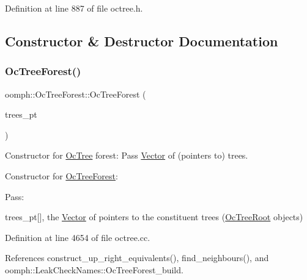 Definition at line 887 of file octree.\+h.



\subsection{Constructor \& Destructor Documentation}
\mbox{\label{classoomph_1_1OcTreeForest_a910a35e25b15e40ac748b2f6decb452e}} 
\subsubsection{\texorpdfstring{Oc\+Tree\+Forest()}{OcTreeForest()}\hspace{0.1cm}{\footnotesize\ttfamily [1/3]}}
{\footnotesize\ttfamily oomph\+::\+Oc\+Tree\+Forest\+::\+Oc\+Tree\+Forest (\begin{DoxyParamCaption}\item[{\hyperlink{classoomph_1_1Vector}{Vector}$<$ \hyperlink{classoomph_1_1TreeRoot}{Tree\+Root} $\ast$ $>$ \&}]{trees\+\_\+pt }\end{DoxyParamCaption})}



Constructor for \hyperlink{classoomph_1_1OcTree}{Oc\+Tree} forest\+: Pass \hyperlink{classoomph_1_1Vector}{Vector} of (pointers to) trees. 

Constructor for \hyperlink{classoomph_1_1OcTreeForest}{Oc\+Tree\+Forest}\+:

Pass\+:
\begin{DoxyItemize}
\item trees\+\_\+pt\mbox{[}\mbox{]}, the \hyperlink{classoomph_1_1Vector}{Vector} of pointers to the constituent trees (\hyperlink{classoomph_1_1OcTreeRoot}{Oc\+Tree\+Root} objects) 
\end{DoxyItemize}

Definition at line 4654 of file octree.\+cc.



References construct\+\_\+up\+\_\+right\+\_\+equivalents(), find\+\_\+neighbours(), and oomph\+::\+Leak\+Check\+Names\+::\+Oc\+Tree\+Forest\+\_\+build.

\mbox{\label{classoomph_1_1OcTreeForest_a096f4c113873868084ca2430d0b7f619}} 
